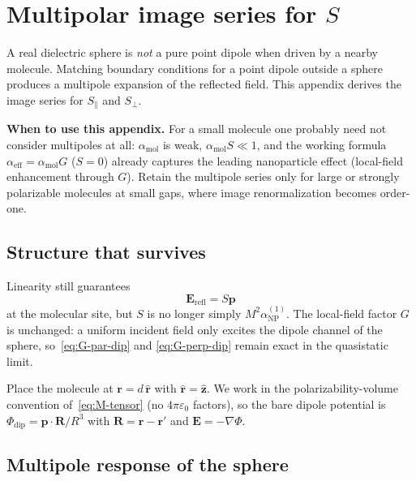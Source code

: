 \documentclass[11pt,a4paper]{article}
\theoremstyle{definition}
\newcommand{\alpham}{\alpha_{\text{mol}}}
\newcommand{\alphanp}{\alpha_{\text{NP}}}
\newcommand{\alphaeff}{\alpha_{\mathrm{eff}}}
\newcommand{\Erefl}{\mathbf{E}_{\mathrm{refl}}}
\newcommand{\p}{\mathbf{p}}
\newcommand{\rhat}{\hat{\mathbf{r}}}
\begin{document}
\appendix
\section{Multipolar image series for $S$}
\label{app:multipolar-S}

\noindent
A real dielectric sphere is \emph{not} a pure point dipole when driven by a nearby molecule. Matching boundary conditions for a point dipole outside a sphere produces a multipole expansion of the reflected field. This appendix derives the image series for $S_\parallel$ and $S_\perp$.

\noindent
\textbf{When to use this appendix.} For a small molecule one probably need not consider multipoles at all: $\alpham$ is weak, $\alpham S\ll 1$, and the working formula $\alphaeff=\alpham G$ ($S=0$) already captures the leading nanoparticle effect (local-field enhancement through $G$). Retain the multipole series only for large or strongly polarizable molecules at small gaps, where image renormalization becomes order-one.

\subsection{Structure that survives}

\noindent
Linearity still guarantees
\begin{equation}
  \Erefl = S \p
  \label{eq:Erefl-S}
\end{equation}
at the molecular site, but $S$ is no longer simply $M^2\alphanp^{(1)}$. The local-field factor $G$ is unchanged: a uniform incident field only excites the dipole channel of the sphere, so~\eqref{eq:G-par-dip} and \eqref{eq:G-perp-dip} remain exact in the quasistatic limit.

\noindent
Place the molecule at $\mathbf{r}=d\,\rhat$ with $\rhat=\hat{\mathbf{z}}$. We work in the polarizability-volume convention of~\eqref{eq:M-tensor} (no $4\pi\varepsilon_0$ factors), so the bare dipole potential is $\Phi_{\mathrm{dip}}=\p\cdot\mathbf{R}/R^3$ with $\mathbf{R}=\mathbf{r}-\mathbf{r}'$ and $\mathbf{E}=-\nabla\Phi$.

\subsection{Multipole response of the sphere}
\end{document}
